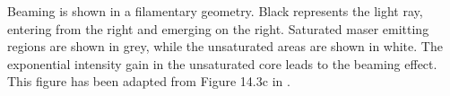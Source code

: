 \label{fig:geometry} Beaming is shown in a filamentary geometry. Black represents the light ray, entering from the right and emerging on the right. Saturated maser emitting regions are shown in grey, while the unsaturated areas are shown in white. The exponential intensity gain in the unsaturated core leads to the beaming effect. This figure has been adapted from Figure 14.3c in \citet{stahler_palla_2004}.